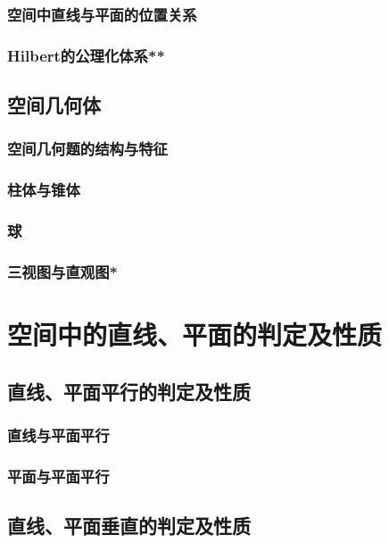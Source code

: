 \subsection{空间中直线与平面的位置关系}



\clearpage
\subsection{Hilbert的公理化体系**}
\clearpage

\section{空间几何体}
\subsection{空间几何题的结构与特征}
\clearpage
\subsection{柱体与锥体}
\clearpage
\subsection{球}
\clearpage
\subsection{三视图与直观图*}
\clearpage
\chapter{空间中的直线、平面的判定及性质}
\clearpage

\section{直线、平面平行的判定及性质}
\subsection{直线与平面平行}
\clearpage
\subsection{平面与平面平行}
\clearpage

\section{直线、平面垂直的判定及性质}
